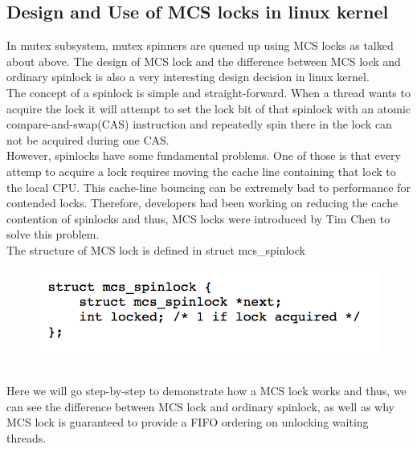 \documentclass[10pt,preprint]{sigplanconf}
\begin{document}
\subsection{Design and Use of MCS locks in linux kernel}
In mutex subsystem, mutex spinners are queued up using MCS locks as talked about above. 
The design of MCS lock and the difference between MCS lock and ordinary spinlock is also a very interesting design decision in linux kernel.\\
The concept of a spinlock is simple and straight-forward. When a thread wants to acquire the lock it will attempt to set the lock bit of that spinlock with an atomic compare-and-swap(CAS) instruction and repeatedly spin there in the lock can not be acquired during one CAS. \\
However, spinlocks have some fundamental problems. One of those is that every attemp to acquire a lock requires moving the cache line containing that lock to the local CPU. This cache-line bouncing can be extremely bad to performance for contended locks. Therefore, developers had been working on reducing the cache contention of spinlocks and thus, MCS locks were introduced by Tim Chen to solve this problem.\\
The structure of MCS lock is defined in struct mcs\_spinlock\\
\begin{figure}[h!]
	\includegraphics[scale=0.8]{mcslock0.png}
\end{figure}\\
Here we will go step-by-step to demonstrate how a MCS lock works and thus, we can see the difference between MCS lock and ordinary spinlock, as well as why MCS lock is guaranteed to provide a FIFO ordering on unlocking waiting threads. \\
\end{document}
